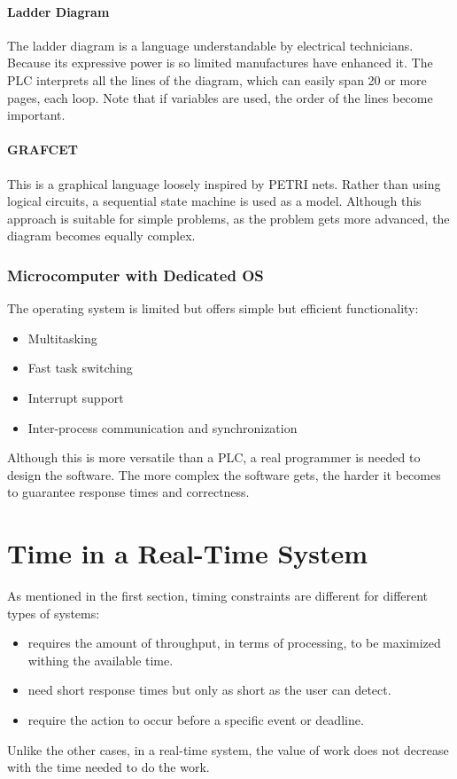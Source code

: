 \documentclass[../main.tex]{subfiles}
\begin{document}
\paragraph{Ladder Diagram} 
The ladder diagram is a language understandable by electrical technicians. Because its expressive power is so limited manufactures have enhanced it. The PLC interprets all the lines of the diagram, which can easily span 20 or more pages, each loop. Note that if variables are used, the order of the lines become important.  

\paragraph{GRAFCET} This is a graphical language loosely inspired by PETRI nets. Rather than using logical circuits, a sequential state machine is used as a model. Although this approach is suitable for simple problems, as the problem gets more advanced, the diagram becomes equally complex.

\subsubsection{Microcomputer with Dedicated OS}
The operating system is limited but offers simple but efficient functionality:
\begin{itemize}
	\item Multitasking
	\item Fast task switching
	\item Interrupt support
	\item Inter-process communication and synchronization
\end{itemize}
Although this is more versatile than a PLC, a real programmer is needed to design the software. The more complex the software gets, the harder it becomes to guarantee response times and correctness.

\section{Time in a Real-Time System}
As mentioned in the first section, timing constraints are different for different types of systems:
\begin{itemize}
	\item {} requires the amount of throughput, in terms of processing, to be maximized withing the available time.
	\item {} need short response times but only as short as the user can detect.
	\item {} require the action to occur before a specific event or deadline.
\end{itemize}
Unlike the other cases, in a real-time system, the value of work does not decrease with the time needed to do the work. 
\end{document}
